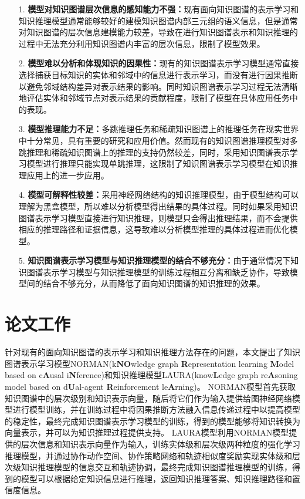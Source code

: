 \documentclass[algorithmlist, AutoFakeBold, AutoFakeSlant, figurelist, tablelist, nomlist, engineering]{seuthesix}
\begin{document}
\begin{itemize}
  \item [1.]\textbf{模型对知识图谱层次信息的感知能力不强：}现有面向知识图谱的表示学习和知识推理模型通常能够较好的建模知识图谱内部三元组的语义信息，但是通常对知识图谱的层次信息建模能力较差，导致在进行知识图谱表示和知识推理的过程中无法充分利用知识图谱内丰富的层次信息，限制了模型效果。
  \item [2.]\textbf{模型难以分析和体现知识的因果性：}现有的知识图谱表示学习模型通常直接选择捕获目标知识的实体和邻域中的信息进行表示学习，而没有进行因果推断以避免邻域结构差异对表示结果的影响。同时知识图谱表示学习过程无法清晰地评估实体和邻域节点对表示结果的贡献程度，限制了模型在具体应用任务中的表现。
  \item [3.]\textbf{模型推理能力不足：}多跳推理任务和稀疏知识图谱上的推理任务在现实世界中十分常见，具有重要的研究和应用价值。然而现有的知识图谱推理模型对多跳推理和稀疏知识图谱上的推理的支持仍然较差，同时，采用知识图谱表示学习模型进行推理只能实现单跳推理，这限制了知识图谱表示学习模型在知识推理应用上的进一步应用。
  \item [4.]\textbf{模型可解释性较差：}采用神经网络结构的知识推理模型，由于模型结构可以理解为黑盒模型，所以难以分析模型得出结果的具体过程。同时如果采用知识图谱表示学习模型直接进行知识推理，则模型只会得出推理结果，而不会提供相应的推理路径和证据信息，这导致难以分析模型推理的具体过程进而优化模型。
  \item [5.]\textbf{知识图谱表示学习模型与知识推理模型的结合不够充分：}由于通常情况下知识图谱表示学习模型与知识推理模型的训练过程相互分离和缺乏协作，导致模型间的结合不够充分，从而降低了面向知识图谱的知识推理的效果。
\end{itemize}

\section{论文工作}
针对现有的面向知识图谱的表示学习和知识推理方法存在的问题，本文提出了知识图谱表示学习模型NORMAN(k\textbf{NO}wledge graph \textbf{R}epresentation learning \textbf{M}odel based on c\textbf{A}usal i\textbf{N}ference)和知识推理模型LAURA(know\textbf{L}edge graph re\textbf{A}soning model based on d\textbf{U}al-agent \textbf{R}einforcement le\textbf{A}rning)。
NORMAN模型首先获取知识图谱中的层次级别和知识表示向量，随后将它们作为输入提供给图神经网络模型进行模型训练，并在训练过程中将因果推断方法融入信息传递过程中以提高模型的稳定性，最终完成知识图谱表示学习模型的训练，得到的模型能够将知识转换为向量表示，并可以为知识推理过程提供支持。
LAURA模型利用NORMAN模型提供的层次信息和知识表示向量作为输入，训练实体级和层次级两种粒度的强化学习推理模型，并通过协作动作空间、协作策略网络和轨迹相似度奖励实现实体级和层次级知识推理模型的信息交互和轨迹协调，最终完成知识图谱推理模型的训练，得到的模型可以根据给定知识信息进行推理，返回知识推理答案、知识推理路径和置信度信息。
\end{document}
